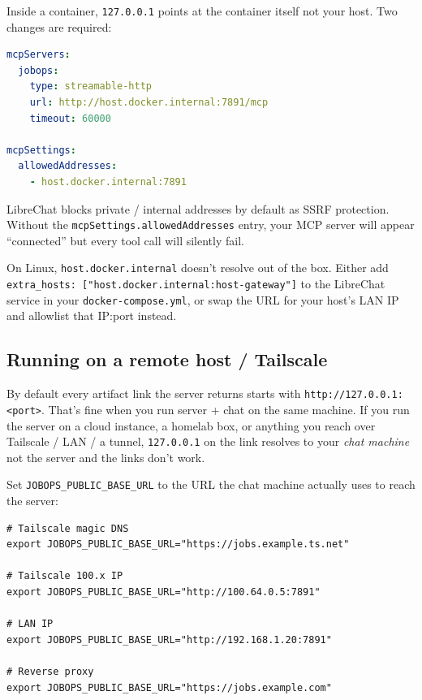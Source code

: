\documentclass[11pt,letterpaper]{article}
\newcommand{\fpath}[1]{\texttt{#1}}
\newcommand{\env}[1]{\texttt{#1}}
\begin{document}
Inside a container, \texttt{127.0.0.1} points at the container itself \textemdash{} not your host. Two changes are required:

\begin{lstlisting}[language=yaml]
mcpServers:
  jobops:
    type: streamable-http
    url: http://host.docker.internal:7891/mcp
    timeout: 60000

mcpSettings:
  allowedAddresses:
    - host.docker.internal:7891
\end{lstlisting}

\begin{warnbox}
LibreChat blocks private / internal addresses by default as SSRF protection. Without the \texttt{mcpSettings.allowedAddresses} entry, your MCP server will appear ``connected'' but every tool call will silently fail.

On Linux, \texttt{host.docker.internal} doesn't resolve out of the box. Either add \texttt{extra\_hosts:\ ["host.docker.internal:host-gateway"]} to the LibreChat service in your \fpath{docker-compose.yml}, or swap the URL for your host's LAN IP and allowlist that IP:port instead.
\end{warnbox}

\subsection*{Running on a remote host / Tailscale}\label{sec:remote-host}

By default every artifact link the server returns starts with \texttt{http://127.0.0.1:<port>}.
That's fine when you run server + chat on the same machine. If you run the server on a
cloud instance, a homelab box, or anything you reach over Tailscale / LAN / a tunnel,
\texttt{127.0.0.1} on the link resolves to your \textit{chat machine} \textemdash{} not the
server \textemdash{} and the links don't work.

Set \env{JOBOPS\_PUBLIC\_BASE\_URL} to the URL the chat machine actually uses to reach
the server:

\begin{lstlisting}[language=bashplus]
# Tailscale magic DNS
export JOBOPS_PUBLIC_BASE_URL="https://jobs.example.ts.net"

# Tailscale 100.x IP
export JOBOPS_PUBLIC_BASE_URL="http://100.64.0.5:7891"

# LAN IP
export JOBOPS_PUBLIC_BASE_URL="http://192.168.1.20:7891"

# Reverse proxy
export JOBOPS_PUBLIC_BASE_URL="https://jobs.example.com"
\end{lstlisting}
\end{document}
